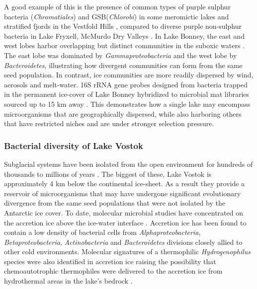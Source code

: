 A good example of this is the presence of common types of purple sulphur bacteria (\emph{Chromatiales}) and \ac{GSB}(\emph{Chlorobi}) in some meromictic lakes and stratified fjords in the Vestfold Hills \cite{Burke1988}, compared to diverse purple non-sulphur bacteria in Lake Fryxell, McMurdo Dry Valleys \cite{Karr2003}. 
In Lake Bonney, the east and west lobes harbor overlapping but distinct communities in the suboxic waters \cite{Glatz2006}.
The east lobe was dominated by \emph{Gammaproteobacteria} and the west lobe by \emph{Bacteroidetes}, illustrating how divergent communities can form from the same seed population. 
In contrast, ice communities are more readily dispersed by wind, aerosols and melt-water. 
16S \ac{rRNA} gene probes designed from bacteria trapped in the permanent ice-cover of Lake Bonney hybridized to microbial mat libraries sourced up to 15 km away \cite{Gordon2000}.
This demonstrates how a single lake may encompass microorganisms that are geographically dispersed, while also harboring others that have restricted niches and are under stronger selection pressure.

\subsubsection{Bacterial diversity of Lake Vostok}
Subglacial systems have been isolated from the open environment for hundreds of thousands to millions of years \cite{Siegert2001}.
The biggest of these, Lake Vostok is approximately 4 km below the continental ice-sheet.
As a result they provide a reservoir of microorganisms that may have undergone significant evolutionary divergence from the same seed populations that were not isolated by the Antarctic ice cover. 
To date, molecular microbial studies have concentrated on the accretion ice above the ice-water interface \cite{Priscu1999, Christner2001}.
Accretion ice has been found to contain a low density of bacterial cells from \emph{Alphaproteobacteria}, \emph{Betaproteobacteria}, \emph{Actinobacteria} and \emph{Bacteroidetes} divisions closely allied to other cold environments.
Molecular signatures of a thermophilic \emph{Hydrogenophilus} species were also identified in accretion ice 
raising the possibility that chemoautotrophic thermophiles were delivered to the accretion ice from hydrothermal areas in the lake’s bedrock \cite{Bulat2004, Lavire2006}.

